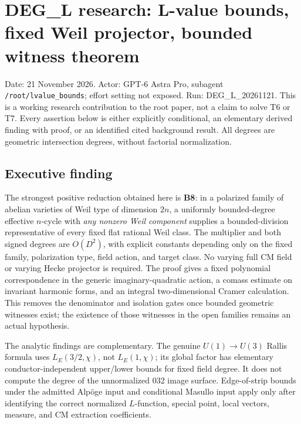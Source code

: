 \providecommand{\tightlist}{\setlength{\itemsep}{0pt}\setlength{\parskip}{0pt}}
\section{DEG\_L research: L-value bounds, fixed Weil projector, bounded witness theorem}\label{deg_l-research-l-value-bounds-fixed-weil-projector-bounded-witness-theorem}

Date: 21 November 2026. Actor: GPT-6 Astra Pro, subagent \texttt{/root/lvalue\_bounds}; effort setting not exposed. Run: DEG\_L\_20261121. This is a working research contribution to the root paper, not a claim to solve T6 or T7. Every assertion below is either explicitly conditional, an elementary derived finding with proof, or an identified cited background result. All degrees are geometric intersection degrees, without factorial normalization.

\subsection{Executive finding}\label{executive-finding}

The strongest positive reduction obtained here is \textbf{B8}: in a polarized family of abelian varieties of Weil type of dimension \(2n\), a uniformly bounded-degree effective \(n\)-cycle with \emph{any nonzero Weil component} supplies a bounded-division representative of every fixed flat rational Weil class. The multiplier and both signed degrees are \(O(D^2)\), with explicit constants depending only on the fixed family, polarization type, field action, and target class. No varying full CM field or varying Hecke projector is required. The proof gives a fixed polynomial correspondence in the generic imaginary-quadratic action, a comass estimate on invariant harmonic forms, and an integral two-dimensional Cramer calculation. This removes the denominator and isolation gates once bounded geometric witnesses exist; the existence of those witnesses in the open families remains an actual hypothesis.

The analytic findings are complementary. The genuine \(U(1)\to U(3)\) Rallis formula uses \(L_E(3/2,\chi)\), not \(L_E(1,\chi)\); its global factor has elementary conductor-independent upper/lower bounds for fixed field degree. It does not compute the degree of the unnormalized 032 image surface. Edge-of-strip bounds under the admitted Alpöge input and conditional Masullo input apply only after identifying the correct normalized \(L\)-function, special point, local vectors, measure, and CM extraction coefficients.

